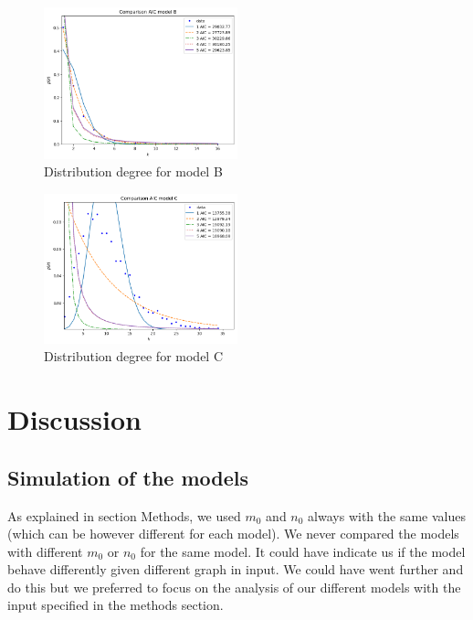 \documentclass{article}
\begin{document}
\begin{figure}[h]
    \centering
    \includegraphics[width=0.5\textwidth]{modelB/all_dd.png}
    \caption{Distribution degree for model B}
    \label{fig:all_dd_B}
\end{figure}

\begin{figure}[h]
    \centering
    \includegraphics[width=0.5\textwidth]{modelC/all_dd.png}
    \caption{Distribution degree for model C}
    \label{fig:all_dd_C}
\end{figure}


\section{Discussion}

\subsection{Simulation of the models}

As explained in section Methods, we used $m_0$ and $n_0$ always with the same
values (which can be however different for each model). We never compared the
models with different $m_0$ or $n_0$ for the same model. It could have indicate
us if the model behave differently given different graph in input. We could have
went further and do this but we preferred to focus on the analysis of our
different models with the input specified in the methods section.
\end{document}
